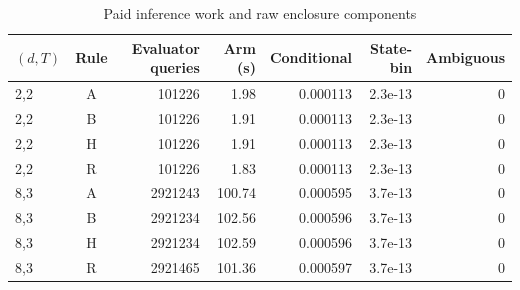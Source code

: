\begin{table}[htbp]
\centering\caption{Paid inference work and raw enclosure components}\label{tab:precision-work70}
{\small\setlength{\tabcolsep}{3pt}
\begin{tabular}{lcrrrrr}
\hline
$(d,T)$ & Rule & Evaluator queries & Arm (s) & Conditional & State-bin & Ambiguous \\
\hline
2,2 & A & 101226 & 1.98 & 0.000113 & 2.3e-13 & 0 \\
2,2 & B & 101226 & 1.91 & 0.000113 & 2.3e-13 & 0 \\
2,2 & H & 101226 & 1.91 & 0.000113 & 2.3e-13 & 0 \\
2,2 & R & 101226 & 1.83 & 0.000113 & 2.3e-13 & 0 \\
8,3 & A & 2921243 & 100.74 & 0.000595 & 3.7e-13 & 0 \\
8,3 & B & 2921234 & 102.56 & 0.000596 & 3.7e-13 & 0 \\
8,3 & H & 2921234 & 102.59 & 0.000596 & 3.7e-13 & 0 \\
8,3 & R & 2921465 & 101.36 & 0.000597 & 3.7e-13 & 0 \\
\hline\end{tabular}}
\par{}
\end{table}
